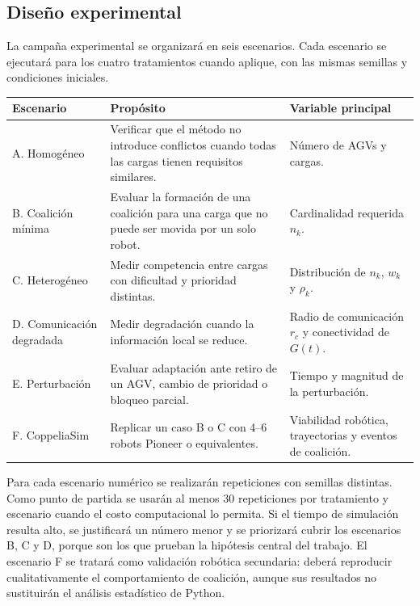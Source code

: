 \documentclass[11pt,a4paper]{article}
\begin{document}
\subsection{Diseño experimental}

La campaña experimental se organizará en seis escenarios. Cada escenario se ejecutará para los cuatro tratamientos cuando aplique, con las mismas semillas y condiciones iniciales.

\begin{center}
\small
\begin{tabular}{p{3.0cm}p{5.4cm}p{5.2cm}}
\toprule
\textbf{Escenario} & \textbf{Propósito} & \textbf{Variable principal} \\
\midrule
A. Homogéneo & Verificar que el método no introduce conflictos cuando todas las cargas tienen requisitos similares. & Número de AGVs y cargas. \\
B. Coalición mínima & Evaluar la formación de una coalición para una carga que no puede ser movida por un solo robot. & Cardinalidad requerida $n_k$. \\
C. Heterogéneo & Medir competencia entre cargas con dificultad y prioridad distintas. & Distribución de $n_k$, $w_k$ y $\rho_k$. \\
D. Comunicación degradada & Medir degradación cuando la información local se reduce. & Radio de comunicación $r_c$ y conectividad de $G(t)$. \\
E. Perturbación & Evaluar adaptación ante retiro de un AGV, cambio de prioridad o bloqueo parcial. & Tiempo y magnitud de la perturbación. \\
F. CoppeliaSim & Replicar un caso B o C con 4--6 robots Pioneer o equivalentes. & Viabilidad robótica, trayectorias y eventos de coalición. \\
\bottomrule
\end{tabular}
\end{center}

Para cada escenario numérico se realizarán repeticiones con semillas distintas. Como punto de partida se usarán al menos 30 repeticiones por tratamiento y escenario cuando el costo computacional lo permita. Si el tiempo de simulación resulta alto, se justificará un número menor y se priorizará cubrir los escenarios B, C y D, porque son los que prueban la hipótesis central del trabajo. El escenario F se tratará como validación robótica secundaria: deberá reproducir cualitativamente el comportamiento de coalición, aunque sus resultados no sustituirán el análisis estadístico de Python.
\end{document}
